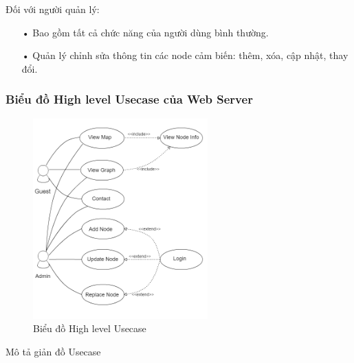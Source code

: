 Đối với người quản lý:
\begin{itemize}
\item[•] Bao gồm tất cả chức năng của người dùng bình thường.
\item[•] Quản lý chỉnh sửa thông tin các node cảm biến: thêm, xóa, cập nhật, thay đổi.
\end{itemize}

\subsubsection*{Biểu đồ High level Usecase của Web Server}
\begin{figure}[H]
\centering    
\includegraphics[width=0.6\textwidth]{usecase_diagram}
\caption[Biểu đồ High level Usecase]{Biểu đồ High level Usecase }
\label{fig:usecase_diagram}
\end{figure}
Mô tả giản đồ Usecase
